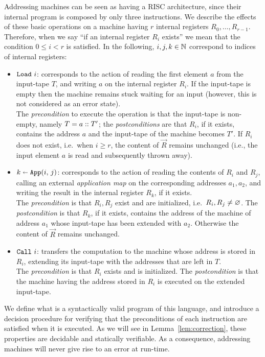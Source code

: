 \noindent
Addressing machines can be seen as having a RISC architecture, since their internal program is composed by only three instructions. We describe the effects of these basic operations on a machine having $r$ internal registers $R_0,\dots,R_{r-1}$.
Therefore, when we say ``if an internal register $R_i$ exists'' we mean that the condition $0\le i< r$ is satisfied.
In the following, $i,j,k\in\nat$ correspond to indices of internal registers:
	\begin{itemize}
	\item $\Load i$: corresponds to the action of reading the first element $a$ from the input-tape $T$, and writing $a$ on the internal register $R_i$. If the input-tape is empty then the machine remains stuck waiting for an input (however, this is not considered as an error state).\\[3pt]
The \emph{precondition} to execute the operation is that the input-tape is non-empty, namely $T = \Cons a T'$; the \emph{postconditions} are that $R_i$, if it exists, contains the address $a$ and the input-tape of the machine becomes $T'$.
	If $R_i$ does not exist, i.e.\ when $i\ge r$, the content of $\vec R$ remains unchanged (i.e., the input element $a$ is read and subsequently thrown away).
	\item $\Apply i j k$: corresponds to the action of reading the contents of $R_i$ and $R_j$, calling an external \emph{application map} on the corresponding addresses $a_1,a_2$, and writing the result in the internal register $R_k$, if it exists.\\[3pt]
The \emph{precondition} is that $R_i,R_j$ exist and are initialized, i.e.\ $R_i,R_j\neq\Null$.
The \emph{postcondition} is that $R_k$, if it exists, contains the address of the machine of address $a_1$ whose input-tape has been extended with $a_2$.
Otherwise the content of $\vec R$ remains unchanged.
	\item
	$\Call i$: transfers the computation to the machine whose address is stored in $R_i$, extending its input-tape with the addresses that are left in $T$.\\[3pt]
	The \emph{precondition} is that $R_i$ exists and is initialized.
	The \emph{postcondition} is that the machine having the address stored in $R_i$ is executed on the extended input-tape.
	\end{itemize}

\noindent
We define what is a syntactically valid program of this language, and  introduce a decision procedure for verifying that the preconditions of each instruction are satisfied when it is executed.
As we will see in Lemma~\ref{lem:correction}, these properties are decidable and statically verifiable.
As a consequence, addressing machines will never give rise to an error at run-time.

